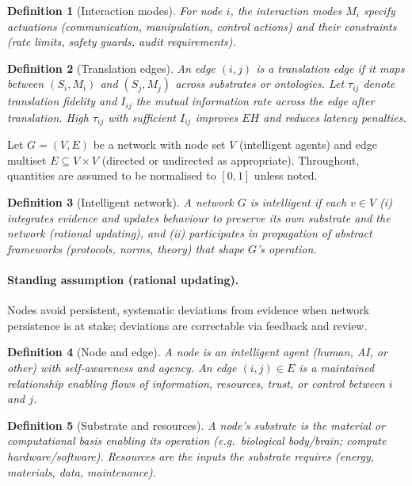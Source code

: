 \documentclass[12pt]{article}
\newtheorem{definition}{Definition}
\begin{document}
\begin{definition}[Interaction modes]\label{def:modes}
For node $i$, the \emph{interaction modes} $M_i$ specify actuations (communication, manipulation, control actions) and their constraints (rate limits, safety guards, audit requirements).
\end{definition}

\begin{definition}[Translation edges]\label{def:translation}
An edge $(i,j)$ is a \emph{translation edge} if it maps between $(S_i,M_i)$ and $(S_j,M_j)$ across substrates or ontologies. Let $\tau_{ij}$ denote translation fidelity and $I_{ij}$ the mutual information rate across the edge after translation. High $\tau_{ij}$ with sufficient $I_{ij}$ improves $EH$ and reduces latency penalties.
\end{definition}

Let $G=(V,E)$ be a network with node set $V$ (intelligent agents) and edge multiset $E\subseteq V\times V$ (directed or undirected as appropriate). Throughout, quantities are assumed to be normalised to $[0,1]$ unless noted.

\begin{definition}[Intelligent network]\label{def:intnet}
A network $G$ is \emph{intelligent} if each $v\in V$ (i) integrates evidence and updates behaviour to preserve its own substrate and the network (rational updating), and (ii) participates in propagation of abstract frameworks (protocols, norms, theory) that shape $G$'s operation.
\end{definition}

\paragraph{Standing assumption (rational updating).}
Nodes avoid persistent, systematic deviations from evidence when network persistence is at stake; deviations are correctable via feedback and review.

\begin{definition}[Node and edge]
A \emph{node} is an intelligent agent (human, AI, or other) with self-awareness and agency. An \emph{edge} $(i,j)\in E$ is a maintained relationship enabling flows of information, resources, trust, or control between $i$ and $j$.
\end{definition}

\begin{definition}[Substrate and resources]
A node’s \emph{substrate} is the material or computational basis enabling its operation (e.g.\ biological body/brain; compute hardware/software). \emph{Resources} are the inputs the substrate requires (energy, materials, data, maintenance).
\end{definition}
\end{document}
